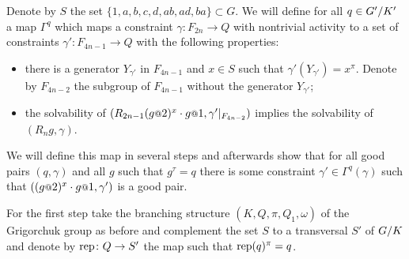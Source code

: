 \documentclass[a4paper,11pt]{amsart}
\begin{document}
Denote by $S$ the set $\{1,a,b,c,d,ab,ad,ba\}\subset G$.
We will define for all $q\in {G'/K'}$ a map $\Gamma^q$ which maps a constraint
$\gamma\colon F_{2n} \to Q$ with nontrivial activity to a set of constraints $\gamma'\colon F_{4n-1}\to Q$ 
with the following properties:
\begin{itemize}
  \item there is a generator $Y_{\gamma'}$ in $F_{4n-1}$ and $x\in S$ such that $\gamma'(Y_{\gamma'})=x^\pi$.
    Denote by $F_{4n-2}$ the subgroup of $F_{4n-1}$ without the generator $Y_{\gamma'}$;
  \item the solvability of $(R_{2n-1} (g\at{2})^x \cdot g\at{1},\gamma'|_{F_{4n-2}})$ implies
  the solvability of $(R_ng,\gamma)$.
 \end{itemize}

 We will define this map in several steps and afterwards show that for all good pairs $(q,\gamma)$ and all $g$ such that $g^\tau=q$ 
 there is some constraint $\gamma' \in \Gamma^q(\gamma)$ such that $((g\at{2})^x \cdot g\at{1},\gamma')$ is a good pair.
 
 For the first step take the branching structure $(K,Q,\pi,Q_1,\omega)$ of the Grigorchuk group as before and 
 complement the set $S$ to a transversal $S'$ of ${G/K}$ and denote by $\textup{rep}\colon Q\to S'$ 
 the map such that $\textup{rep}(q)^\pi = q$.
 
\end{document}
